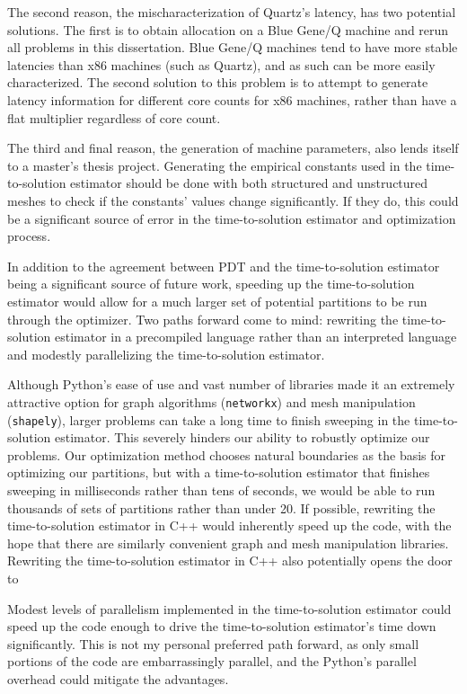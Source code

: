 The second reason, the mischaracterization of Quartz's latency, has two potential solutions.
The first is to obtain allocation on a Blue Gene/Q machine and rerun all problems in this dissertation.
Blue Gene/Q machines tend to have more stable latencies than x86 machines (such as Quartz), and as such can be more easily characterized.
The second solution to this problem is to attempt to generate latency information for different core counts for x86 machines, rather than have a flat multiplier regardless of core count. 

The third and final reason, the generation of machine parameters, also lends itself to a master's thesis project.
Generating the empirical constants used in the time-to-solution estimator should be done with both structured and unstructured meshes to check if the constants' values change significantly.
If they do, this could be a significant source of error in the time-to-solution estimator and optimization process.

In addition to the agreement between PDT and the time-to-solution estimator being a significant source of future work, speeding up the time-to-solution estimator would allow for a much larger set of potential partitions to be run through the optimizer.
Two paths forward come to mind: rewriting the time-to-solution estimator in a precompiled language rather than an interpreted language and modestly parallelizing the time-to-solution estimator.

Although Python's ease of use and vast number of libraries made it an extremely attractive option for graph algorithms ({\tt networkx}) and mesh manipulation ({\tt shapely}), larger problems can take a long time to finish sweeping in the time-to-solution estimator.
This severely hinders our ability to robustly optimize our problems.
Our optimization method chooses natural boundaries as the basis for optimizing our partitions, but with a time-to-solution estimator that finishes sweeping in milliseconds rather than tens of seconds, we would be able to run thousands of sets of partitions rather than under 20. 
If possible, rewriting the time-to-solution estimator in C++ would inherently speed up the code, with the hope that there are similarly convenient graph and mesh manipulation libraries. 
Rewriting the time-to-solution estimator in C++ also potentially opens the door to 

Modest levels of parallelism implemented in the time-to-solution estimator could speed up the code enough to drive the time-to-solution estimator's time down significantly.
This is not my personal preferred path forward, as only small portions of the code are embarrassingly parallel, and the Python's parallel overhead could mitigate the advantages. 